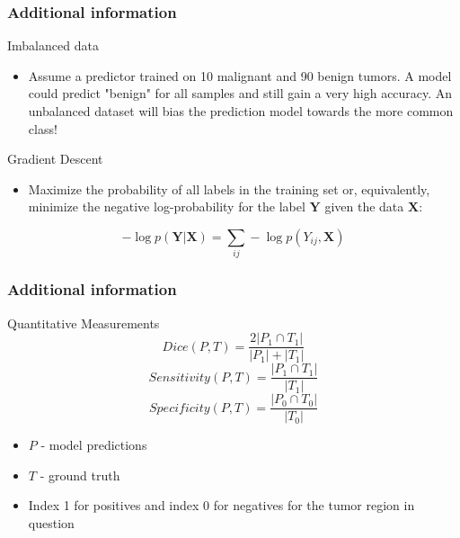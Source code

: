 \documentclass[aspectratio=43, notes]{beamer} 	%
\begin{document}
\begin{frame}
	\frametitle<presentation>{Additional information}
	\begin{block}{Imbalanced data}
		\begin{itemize}
			\item Assume a predictor trained on 10 malignant and 90 benign tumors. A model could predict "benign" for all samples and still gain a very high accuracy. An unbalanced dataset will bias the prediction model towards the more common class!
		\end{itemize}
	\end{block}
	\begin{block}{Gradient Descent}
		\begin{itemize}
			\item Maximize the probability of all labels in the training set or, equivalently, minimize the negative log-probability for the label $\mathbf{Y}$ given the data $\mathbf{X}$:
		\end{itemize}
	\begin{equation}
		 -\log p(\mathbf{Y}|\mathbf{X}) = \sum\limits_{ij} -\log p(Y_{ij}, \mathbf{X})
	\end{equation}
	\end{block}	
\end{frame}

\begin{frame}
	\frametitle<presentation>{Additional information}
	\begin{block}{Quantitative Measurements}
		\begin{equation}
			Dice(P, T) = \frac{2 |P_1 \cap T_1|}{|P_1| + |T_1|}
		\end{equation}
		\begin{equation}
			Sensitivity(P, T) = \frac{|P_1 \cap T_1|}{|T_1|}
		\end{equation}
		\begin{equation}
			Specificity(P, T) = \frac{|P_0 \cap T_0|}{|T_0|}
		\end{equation}
		\begin{itemize}
			\item $P$ - model predictions
			\item $T$ - ground truth
			\item Index 1 for positives and index 0 for negatives for the tumor region in question
		\end{itemize}
	\end{block}
\end{frame}
\end{document}
